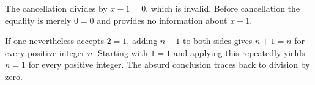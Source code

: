 The cancellation divides by $x-1=0$, which is invalid. Before cancellation the equality is merely $0=0$ and provides no information about $x+1$.

If one nevertheless accepts $2=1$, adding $n-1$ to both sides gives $n+1=n$ for every positive integer $n$. Starting with $1=1$ and applying this repeatedly yields $n=1$ for every positive integer. The absurd conclusion traces back to division by zero.
